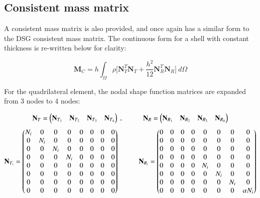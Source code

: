 \subsection{Consistent mass matrix}
A consistent mass matrix is also provided, and once again has a similar form to the DSG consistent mass matrix. The continuous form for a shell with constant thickness is re-written below for clarity:

\begin{equation} 
\mathbf{M}_C
=
h
\int_{\Omega} 
\rho 
\Big[
\mathbf{N}_T^T
\mathbf{N}_T
+
\frac{h^2}{12}
\mathbf{N}_R^T
\mathbf{N}_R
\Big]
\ d\Omega
\label{eqqmass4}
\end{equation}

For the quadrilateral element, the nodal shape function matrices are expanded from 3 nodes to 4 nodes:

\begin{equation} 
\mathbf{N}_T = 
\begin{pmatrix}
\mathbf{N}_{T_1} & \mathbf{N}_{T_2} & \mathbf{N}_{T_3} & \mathbf{N}_{T_4}
\end{pmatrix}\ ,
\hspace{10mm}
\mathbf{N}_R = 
\begin{pmatrix}
\mathbf{N}_{R_1} & \mathbf{N}_{R_2} & \mathbf{N}_{R_3} & \mathbf{N}_{R_4}
\end{pmatrix}
\label{eqqmass5}
\end{equation}
\begin{equation} 
\mathbf{N}_{T_i} = 
\begin{pmatrix}
N_i & 0 & 0 & 0 & 0 & 0 & 0 & 0\\
0 & N_i & 0 & 0 & 0 & 0 & 0 & 0\\
0 & 0 & N_i & 0 & 0 & 0 & 0 & 0\\
0 & 0 & 0 & N_i & 0 & 0 & 0 & 0\\
0 & 0 & 0 & 0 & 0 & 0 & 0 & 0\\
0 & 0 & 0 & 0 & 0 & 0 & 0 & 0\\
0 & 0 & 0 & 0 & 0 & 0 & 0 & 0\\
0 & 0 & 0 & 0 & 0 & 0 & 0 & 0
\end{pmatrix}
\hspace{10mm}
\mathbf{N}_{R_i} = 
\begin{pmatrix}
0 & 0 & 0 & 0 & 0 & 0 & 0 & 0\\
0 & 0 & 0 & 0 & 0 & 0& 0 & 0\\
0 & 0 & 0 & 0 & 0 & 0 & 0 & 0\\
0 & 0 & 0 & 0 & 0 & 0 & 0 & 0\\
0 &0 & 0 & 0 & N_i & 0 & 0  & 0\\
0 &0 & 0 & 0 & 0 & N_i & 0  & 0\\
0 &0 & 0 & 0 & 0 & 0 & N_i  & 0\\
0 &0 & 0 & 0 & 0 & 0 & 0 & \alpha N_i
\end{pmatrix}
\label{eqqmass5_1}
\end{equation}


